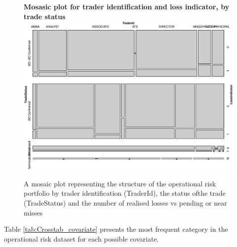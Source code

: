 \documentclass{DissertateUSU}
\begin{document}
\singlespacing

\singlespacing
\begin{figure}
\centering
\textbf{Mosasic plot for trader identification and loss indicator, by trade status}
\includegraphics[width=\linewidth,height=0.75\linewidth]{Mosaic_Contingency.eps}
\caption[Portfolio structure by trader, trade status and number of realised losses]{A mosaic plot representing the structure of the operational risk portfolio by trader identification (TraderId), the status ofthe trade (TradeStatus) and the number of realised losses vs pending or near misses}
\label{Mosaic_Contingency}
\end{figure}
\doublespacing

Table \ref{tab:Crosstab_covariate} presents the most frequent category
in the operational risk dataset for each possible covariate.
\end{document}
